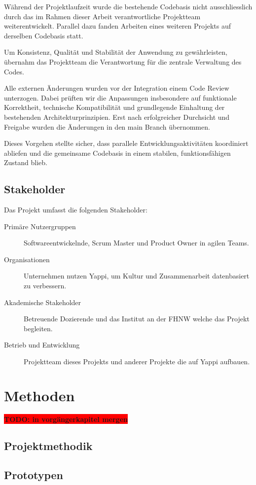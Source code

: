 \documentclass[12pt,a4paper]{report}
\newcommand{\todo}[1]{\colorbox{red}{\textbf{TODO: #1}}\\}
\begin{document}
Während der Projektlaufzeit wurde die bestehende Codebasis nicht ausschliesslich durch das im Rahmen dieser Arbeit verantwortliche
Projektteam weiterentwickelt. Parallel dazu fanden Arbeiten eines weiteren Projekts auf derselben Codebasis statt. 

Um Konsistenz, Qualität und Stabilität der Anwendung zu gewährleisten, übernahm das Projektteam die Verantwortung für die zentrale
Verwaltung des Codes.

Alle externen Änderungen wurden vor der Integration einem Code Review unterzogen. Dabei prüften wir die Anpassungen insbesondere
auf funktionale Korrektheit, technische Kompatibilität und grundlegende Einhaltung der bestehenden Architekturprinzipien. Erst
nach erfolgreicher Durchsicht und Freigabe wurden die Änderungen in den main Branch übernommen.

Dieses Vorgehen stellte sicher, dass parallele Entwicklungsaktivitäten koordiniert abliefen und die gemeinsame Codebasis in einem
stabilen, funktionsfähigen Zustand blieb.

\section{Stakeholder}

Das Projekt umfasst die folgenden Stakeholder:

\begin{description}
  \item[Primäre Nutzergruppen] Softwareentwickelnde, Scrum Master und Product Owner in agilen Teams. 
  \item[Organisationen] Unternehmen nutzen Yappi, um Kultur und Zusammenarbeit datenbasiert zu verbessern.
  \item[Akademische Stakeholder] Betreuende Dozierende und das Institut an der FHNW welche das Projekt begleiten.
  \item[Betrieb und Entwicklung] Projektteam dieses Projekts und anderer Projekte die auf Yappi aufbauen.
\end{description}

\chapter{Methoden}
\todo{in vorgängerkapitel mergen}
\section{Projektmethodik}
\section{Prototypen}
\end{document}
